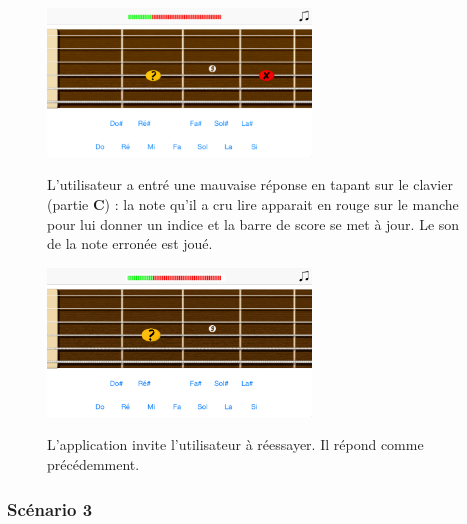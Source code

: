 \documentclass{scrreprt}
\begin{document}
\begin{figure}[!ht]
  \begin{minipage}{0.55\linewidth}
    \includegraphics[width=7cm]{images/maquette_usecase/clavier/mauvaise.png}
  \end{minipage}\hfill
 \begin{minipage}{0.5\linewidth}
  {L'utilisateur a entré une mauvaise réponse en tapant sur le clavier (partie \textbf{C}) : la note qu'il a cru lire apparait en rouge sur le manche pour lui donner un indice et la barre de score se met à jour. Le son de la note erronée est joué.}
   \end{minipage}
\end{figure} 

\bigbreak

\begin{figure}[!ht]
  \begin{minipage}{0.55\linewidth}
    \includegraphics[width=7cm]{images/maquette_usecase/clavier/mauvaise_reponse_nouvel_essai.png}
  \end{minipage}\hfill
  \begin{minipage}{0.5\linewidth}
  {L'application invite l'utilisateur à réessayer. Il répond comme précédemment.}
   \end{minipage}
\end{figure}

\bigbreak

\newpage


\subsubsection{Scénario 3}
\end{document}
